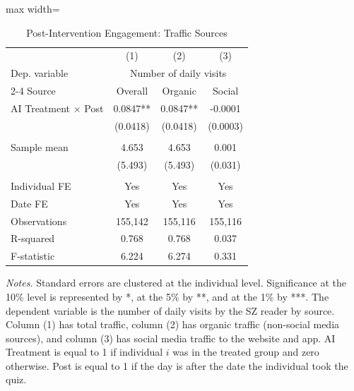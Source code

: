  \begin{table}[H]
 \centering 
 \caption{Post-Intervention Engagement: Traffic Sources} 
 \label{tab:results_visits_social} 
 \begin{adjustbox}{max width=\textwidth} 
\begin{tabular}{lccc} 
 \toprule
& (1) & (2) & (3)  \\
 Dep. variable & \multicolumn{3}{c}{Number of daily visits} \\ 
 \cmidrule(lr){2-4} 
Source & Overall & Organic & Social \\
 \midrule 
AI Treatment $\times$ Post&   0.0847** &   0.0847** &  -0.0001   \\
                & (0.0418)   & (0.0418)   & (0.0003)   \\
& & &  \\
Sample mean&      4.653 &      4.653 &      0.001  \\
& (5.493) & (5.493) & (0.031)  \\
& & &  \\
Individual FE & Yes & Yes & Yes\\
Date FE & Yes & Yes & Yes \\
 \midrule
Observations &    155,142 &    155,116 &    155,116  \\
R-squared&      0.768 &      0.768 &      0.037  \\
F-statistic &      6.224 &      6.274 &      0.331  \\
 \bottomrule
 \end{tabular}
 \end{adjustbox}
 \par
 \begin{minipage}{0.75\linewidth}
 \baselineskip9pt {\scriptsize \vspace{0.1cm} { \it Notes.} Standard errors are clustered at the individual level. Significance at the 10\% level is represented by *, at the 5\% by **, and at the 1\% by ***. The dependent variable is the number of daily visits by the SZ reader by source. Column (1) has total traffic, column (2) has organic traffic (non-social media sources), and column (3) has social media traffic to the website and app.  AI Treatment is equal to 1 if individual $i$ was in the treated group and zero otherwise. Post is equal to 1 if the day is after the date the individual took the quiz.}
 \end{minipage}
 \end{table}
